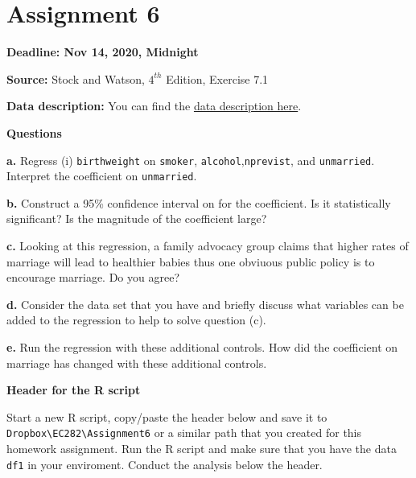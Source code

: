 \documentclass[
]{book}
\begin{document}
\hypertarget{assignment-6}{%
\section{Assignment 6}\label{assignment-6}}

\textbf{Deadline: Nov 14, 2020, Midnight}

\textbf{Source:} Stock and Watson, \(4^{th}\) Edition, Exercise 7.1

\textbf{Data description:} You can find the \href{https://www.dropbox.com/s/s0q564v6lplbexu/Birthweight_Smoking_Description.pdf?dl=1}{data description here}.

\textbf{Questions}

\textbf{a.} Regress (i) \texttt{birthweight} on \texttt{smoker}, \texttt{alcohol},\texttt{nprevist}, and \texttt{unmarried}. Interpret the coefficient on \texttt{unmarried}.

\textbf{b.} Construct a 95\% confidence interval on for the coefficient. Is it statistically significant? Is the magnitude of the coefficient large?

\textbf{c.} Looking at this regression, a family advocacy group claims that higher rates of marriage will lead to healthier babies thus one obviuous public policy is to encourage marriage. Do you agree?

\textbf{d.} Consider the data set that you have and briefly discuss what variables can be added to the regression to help to solve question (c).

\textbf{e.} Run the regression with these additional controls. How did the coefficient on marriage has changed with these additional controls.

\textbf{Header for the R script}

Start a new R script, copy/paste the header below and save it to \texttt{Dropbox\textbackslash{}EC282\textbackslash{}Assignment6} or a similar path that you created for this homework assignment. Run the R script and make sure that you have the data \texttt{df1} in your enviroment. Conduct the analysis below the header.
\end{document}
